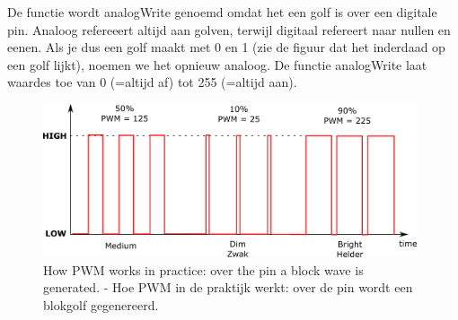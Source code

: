 \documentclass[11pt]{article}
\begin{document}
\begin{Parallel}{7.5cm}{7.5cm}
{De functie wordt analogWrite genoemd omdat het een golf is over een digitale pin. Analoog refereeert altijd aan golven, terwijl digitaal refereert naar nullen en eenen. Als je dus een golf maakt met 0 en 1 (zie de figuur dat het inderdaad op een golf lijkt), noemen we het opnieuw analoog. De functie analogWrite laat waardes toe van 0 (=altijd af) tot 255 (=altijd aan).
}

\begin{figure}
  \centering
  \includegraphics[width=11cm]{png/PWM} 
\caption{How PWM works in practice: over the pin a block wave is generated. - Hoe PWM in de praktijk werkt: over de pin wordt een blokgolf gegenereerd.}
\label{f:PWM}
\end{figure}


\end{Parallel}
\end{document}
